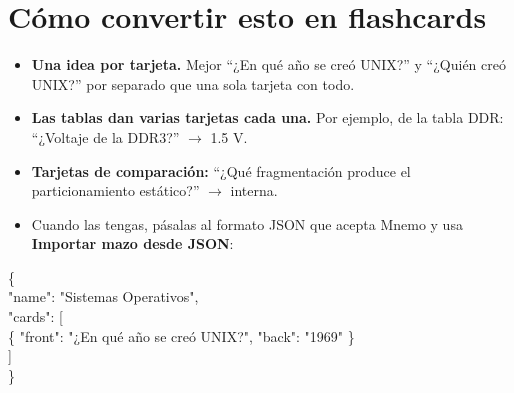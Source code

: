\documentclass[11pt,a4paper]{article}
\begin{document}
\section{Cómo convertir esto en flashcards}
\begin{itemize}
  \item \textbf{Una idea por tarjeta.} Mejor ``¿En qué año se creó UNIX?'' y ``¿Quién creó UNIX?'' por separado
        que una sola tarjeta con todo.
  \item \textbf{Las tablas dan varias tarjetas cada una.} Por ejemplo, de la tabla DDR:
        ``¿Voltaje de la DDR3?'' $\rightarrow$ 1.5 V.
  \item \textbf{Tarjetas de comparación:} ``¿Qué fragmentación produce el particionamiento estático?'' $\rightarrow$ interna.
  \item Cuando las tengas, pásalas al formato JSON que acepta Mnemo y usa \textbf{Importar mazo desde JSON}:
\end{itemize}
\begin{tcolorbox}[colback=gray!5,colframe=gray!50,boxrule=0.5pt,arc=2pt]
\small\ttfamily
\{\\
\hspace*{1em}"name": "Sistemas Operativos",\\
\hspace*{1em}"cards": [\\
\hspace*{2em}\{ "front": "¿En qué año se creó UNIX?", "back": "1969" \}\\
\hspace*{1em}]\\
\}
\end{tcolorbox}
\end{document}
